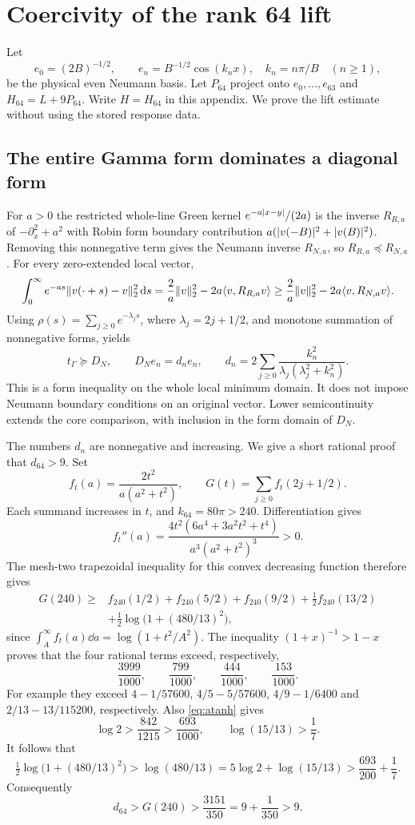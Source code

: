 \section{Coercivity of the rank 64 lift}\label{sec:lift}
Let
\[
 e_0=(2B)^{-1/2},\qquad e_n=B^{-1/2}\cos(k_nx),\quad
 k_n=n\pi/B\quad(n\ge1),
\]
be the physical even Neumann basis. Let $P_{64}$ project onto
$e_0,\ldots,e_{63}$ and $H_{64}=L+9P_{64}$. Write $H=H_{64}$ in this appendix. We prove the lift estimate
without using the stored response data.

\subsection{The entire Gamma form dominates a diagonal form}
For $a>0$ the restricted whole-line Green kernel
$e^{-a\lvert x-y\rvert}/(2a)$ is the inverse $R_{R,a}$ of
$-\partial_x^2+a^2$ with Robin form boundary contribution
$a(\lvert v(-B)\rvert^2+\lvert v(B)\rvert^2)$. Removing this nonnegative term gives
the Neumann inverse $R_{N,a}$, so $R_{R,a}\preceq R_{N,a}$.
For every zero-extended local vector,
\[
 \int_0^\infty e^{-as}\lVert v(\cdot+s)-v\rVert_2^2\mathop{}\!\mathrm d s
 =\frac2a\lVert v\rVert_2^2-2a\langle v,R_{R,a}v\rangle
 \ge\frac2a\lVert v\rVert_2^2-2a\langle v,R_{N,a}v\rangle.
\]
Using $\rho(s)=\sum_{j\ge0}e^{-\lambda_js}$, where
$\lambda_j=2j+1/2$, and monotone summation of nonnegative forms, yields
\begin{equation}\label{eq:DN}
 t_\Gamma\succeq D_N,\qquad
 D_Ne_n=d_ne_n,\qquad
 d_n=2\sum_{j\ge0}\frac{k_n^2}{\lambda_j(\lambda_j^2+k_n^2)}.
\end{equation}
This is a form inequality on the whole local minimum domain. It does
not impose Neumann boundary conditions on an original vector. Lower
semicontinuity extends the core comparison, with inclusion in the
form domain of $D_N$.

The numbers $d_n$ are nonnegative and increasing. We give a short
rational proof that $d_{64}>9$. Set
\[
 f_t(a)=\frac{2t^2}{a(a^2+t^2)},\qquad G(t)=\sum_{j\ge0}f_t(2j+1/2).
\]
Each summand increases in $t$, and $k_{64}=80\pi>240$.
Differentiation gives
\[
 f_t''(a)=\frac{4t^2(6a^4+3a^2t^2+t^4)}{a^3(a^2+t^2)^3}>0.
\]
The mesh-two trapezoidal inequality for this convex decreasing function
therefore gives
\begin{align*}
 G(240)\ge{}&f_{240}(1/2)+f_{240}(5/2)+f_{240}(9/2)
 +\tfrac12f_{240}(13/2)\\
 &+\tfrac12\log\bigl(1+(480/13)^2\bigr),
\end{align*}
since $\int_A^\infty f_t(a)\dd a=\log(1+t^2/A^2)$.
The inequality $(1+x)^{-1}>1-x$ proves that the four rational terms
exceed, respectively,
\[
 \frac{3999}{1000},\qquad\frac{799}{1000},\qquad
 \frac{444}{1000},\qquad\frac{153}{1000}.
\]
For example they exceed $4-1/57600$, $4/5-5/57600$,
$4/9-1/6400$ and $2/13-13/115200$, respectively.
Also \eqref{eq:atanh} gives
\[
 \log2>\frac{842}{1215}>\frac{693}{1000},\qquad
 \log(15/13)>\frac17.
\]
It follows that
\[
 \tfrac12\log\bigl(1+(480/13)^2\bigr)
 >\log(480/13)=5\log2+\log(15/13)
 >\frac{693}{200}+\frac17.
\]
Consequently
\begin{equation}\label{eq:d64}
 d_{64}>G(240)>\frac{3151}{350}=9+\frac1{350}>9.
\end{equation}

